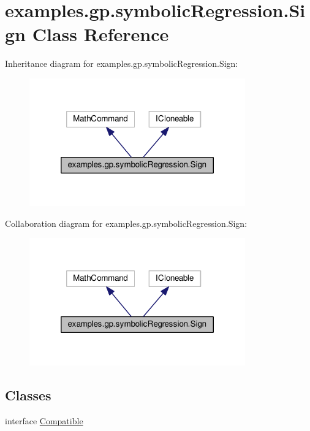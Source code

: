 \hypertarget{classexamples_1_1gp_1_1symbolic_regression_1_1_sign}{\section{examples.\-gp.\-symbolic\-Regression.\-Sign Class Reference}
\label{classexamples_1_1gp_1_1symbolic_regression_1_1_sign}
}


Inheritance diagram for examples.\-gp.\-symbolic\-Regression.\-Sign\-:
\nopagebreak
\begin{figure}[H]
\begin{center}
\leavevmode
\includegraphics[width=264pt]{classexamples_1_1gp_1_1symbolic_regression_1_1_sign__inherit__graph}
\end{center}
\end{figure}


Collaboration diagram for examples.\-gp.\-symbolic\-Regression.\-Sign\-:
\nopagebreak
\begin{figure}[H]
\begin{center}
\leavevmode
\includegraphics[width=264pt]{classexamples_1_1gp_1_1symbolic_regression_1_1_sign__coll__graph}
\end{center}
\end{figure}
\subsection*{Classes}
\begin{DoxyCompactItemize}
\item 
interface \hyperlink{interfaceexamples_1_1gp_1_1symbolic_regression_1_1_sign_1_1_compatible}{Compatible}
\end{DoxyCompactItemize}
